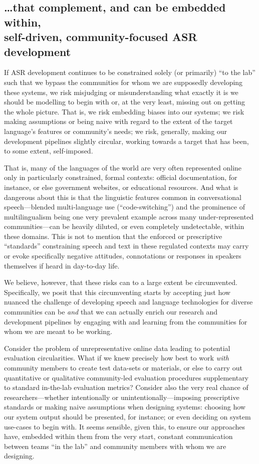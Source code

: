 \documentclass[10pt,twoside,openright]{report}
\begin{document}
\subsection{\ldots that complement, and can be embedded within,\texorpdfstring{\\}{ }self-driven, community-focused ASR development}
If ASR development continues to be constrained solely (or primarily) ``to the lab'' such that we bypass the communities for whom we are supposedly developing these systems, we risk misjudging or misunderstanding what exactly it is we should be modelling to begin with or, at the very least, missing out on getting the whole picture. 
That is, we risk embedding biases into our systems; we risk making assumptions or being naive with regard to the extent of the target language's features or community's needs; we risk, generally, making our development pipelines slightly circular, working towards a target that has been, to some extent, self-imposed.

That is, many of the languages of the world are very often represented online only in particularly constrained, formal contexts: official documentation, for instance, or else government websites, or educational resources.
And what is dangerous about this is that the linguistic features common in conversational speech---blended multi-language use (``code-switching'') and the prominence of multilingualism being one very prevalent example %
across many under-represented communities---can be heavily diluted, or even completely undetectable, within these domains.
This is not to mention that the enforced or prescriptive ``standards'' constraining speech and text in these regulated contexts may carry or evoke specifically negative attitudes, connotations or responses in speakers themselves if heard in day-to-day life.

We believe, however, that these risks can to a large extent be circumvented.
Specifically, we posit that this circumventing starts by accepting just how nuanced the challenge of developing speech and language technologies for diverse communities can be \textit{and} that we can actually enrich our research and development pipelines by engaging with and learning from the communities for whom we are meant to be working.

Consider the problem of unrepresentative online data leading to potential evaluation circularities.
What if we knew precisely how best to work \textit{with} community members to create test data-sets or materials, or else to carry out quantitative or qualitative community-led evaluation procedures supplementary to standard in-the-lab evaluation metrics?
Consider also the very real chance of researchers---whether intentionally or unintentionally---imposing prescriptive standards or making naive assumptions when designing systems: choosing how our system output should be presented, for instance; or even deciding on system use-cases to begin with.
It seems sensible, given this, to ensure our approaches have, embedded within them from the very start, constant communication between teams ``in the lab'' and community members with whom we are designing.
\end{document}
